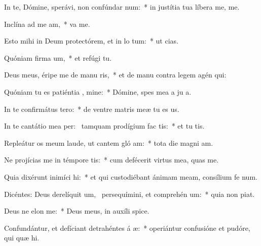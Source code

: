\item In te, Dómine, sperávi, non confúndar  num:~* in justítia tua líbera me,   me.
\item Inclína ad me  am,~*  va me.
\item Esto mihi in Deum protectórem, et in lo tum:~* ut   cias.
\item Quóniam firma um,~* et refúgi   tu.
\item Deus meus, éripe me de manu ris,~* et de manu contra legem agén  qui:
\item Quóniam tu es patiéntia , mine:~* Dómine, spes mea a ju a.
\item In te confirmátus   tero:~* de ventre matris meæ tu es  us.
\item In te cantátio mea per:~\pscross{} tamquam prodígium fac  tis:~* et tu  tis.
\item Repleátur os meum laude, ut cantem gló am:~* tota die magni am.
\item Ne projícias me in témpore tis:~* cum defécerit virtus mea,  quas me.
\item Quia dixérunt inimíci  hi:~* et qui custodiébant ánimam meam, consílium fe  num.
\item Dicéntes: Deus derelíquit um,~\pscross{} persequímini, et comprehén um:~* quia non   piat.
\item Deus ne elon  me:~* Deus meus, in auxíli  spice.
\item Confundántur, et defíciant detrahéntes á æ:~* operiántur confusióne et pudóre, qui quæ  hi.
